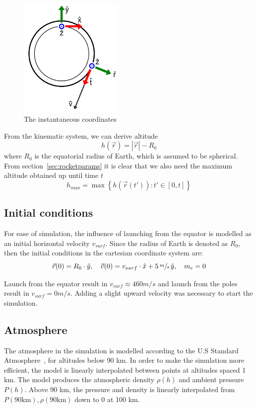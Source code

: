 \documentclass[11pt]{article}
\begin{document}
\begin{figure}[H]
  \centering
  \includegraphics[width=0.45\textwidth]{./orbit.png}
  \caption{The instantaneous coordinates}
\end{figure}

From the kinematic system, we can derive altitude
$$
h(\vec{r}) = \left| \vec{r} \right| - R_0
$$
where $R_0$ is the equatorial radius of Earth, which is assumed to be spherical.
From section~\ref{sec:rocketparams} it is clear that we also need the maximum altitude obtained up until time $t$
$$
h_{max} = \max \left\{  h(\vec{r}(t')) : t' \in [0, t] \right\}
$$

\subsection{Initial conditions}
For ease of simulation, the influence of launching from the equator is modelled as an initial horizontal velocity $v_{surf}$.
Since the radius of Earth is denoted as $R_0$, then the initial conditions in the cartesian coordinate system are:
$$
\vec{r}(0) = R_0 \cdot \hat{y}, \quad \vec{v}(0) = v_{surf} \cdot \hat{x} + 5 \, \sfrac{m}{s} \, \hat{y}, \quad m_e = 0
$$

Launch from the equator result in $v_{surf} \approx 460 m/s$ and launch from the poles result in $v_{surf} = 0 m/s$. 
Adding a slight upward velocity was necessary to start the simulation.

\subsection{Atmosphere} \label{sec:atmosphere}
The atmosphere in the simulation is modelled according to the U.S Standard Atmosphere~\cite{atmosphere2014}, for altitudes below 90 km. 
In order to make the simulation more efficient, the model is linearly interpolated between points at altitudes spaced 1 km.
The model produces the atmospheric density $\rho(h)$ and ambient pressure $P(h)$.
Above 90 km, the pressure and density is linearly interpolated from $P(90 \text{km}), \rho(90 \text{km})$ down to 0 at 100 km.
\end{document}
